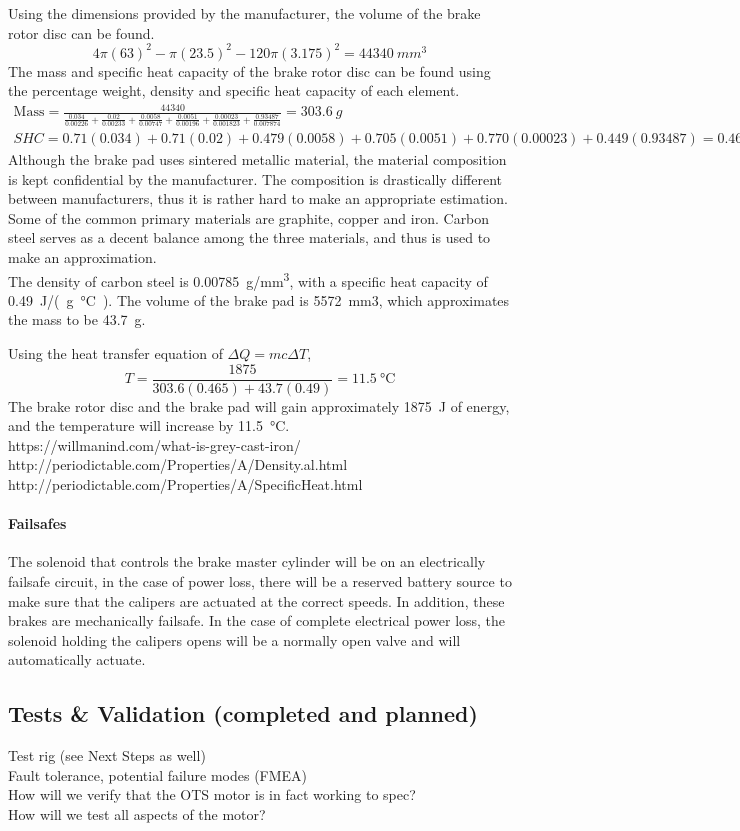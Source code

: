 \documentclass[main.tex]{subfile}
\begin{document}
    Using the dimensions provided by the manufacturer, the volume of the brake rotor disc can be found.
    \[
    4\pi(63)^2-\pi(23.5)^2-120\pi(3.175)^2=\SI{44340}{mm^3}
    \]
    The mass and specific heat capacity of the brake rotor disc can be found using the percentage weight, density and specific heat capacity of each element.
    \begin{gather*}
    \mathrm{Mass} = \frac{44340}{\frac{0.034}{0.00226} + \frac{0.02}{0.00233} + \frac{0.0058}{0.00747} + \frac{0.0051}{0.00196} + \frac{0.00023}{0.001823} + \frac{0.93487}{0.007874}} = \SI{303.6}{g}\\
    \textit{SHC}=0.71(0.034)+0.71(0.02)+0.479(0.0058)+0.705(0.0051)+0.770(0.00023)+0.449(0.93487)=0.465
    \end{gather*}
    Although the brake pad uses sintered metallic material, the material composition is kept confidential by the manufacturer. The composition is drastically different between manufacturers, thus it is rather hard to make an appropriate estimation. Some of the common primary materials are graphite, copper and iron. Carbon steel serves as a decent balance among the three materials, and thus is used to make an approximation.\\

    The density of carbon steel is \SI{0.00785}{g/mm^3}, with a specific heat capacity of \SI{0.49}{J/(g\celsius)}. The volume of the brake pad is \SI{5572}{mm3}, which approximates the mass to be \SI{43.7}{g}.

    Using the heat transfer equation of $\Delta Q = mc \Delta T$,
    \[
    T=\frac{1875}{303.6(0.465)+43.7(0.49)}=\SI{11.5}{\celsius}
    \]
    The brake rotor disc and the brake pad will gain approximately \SI{1875}{J} of energy, and the temperature will increase by \SI{11.5}{\celsius}.\\

    https://willmanind.com/what-is-grey-cast-iron/\\
    http://periodictable.com/Properties/A/Density.al.html\\
    http://periodictable.com/Properties/A/SpecificHeat.html

    \paragraph{Failsafes}
    The solenoid that controls the brake master cylinder will be on an electrically failsafe circuit, in the case of power loss, there will be a reserved battery source to make sure that the calipers are actuated at the correct speeds. In addition, these brakes are mechanically failsafe. In the case of complete electrical power loss, the solenoid holding the calipers opens will be a normally open valve and will automatically actuate.

    \subsection{Tests \& Validation (completed and planned)}
    Test rig (see Next Steps as well)\\
    Fault tolerance, potential failure modes (FMEA)\\
    How will we verify that the OTS motor is in fact working to spec?\\
    How will we test all aspects of the motor?
\end{document}
